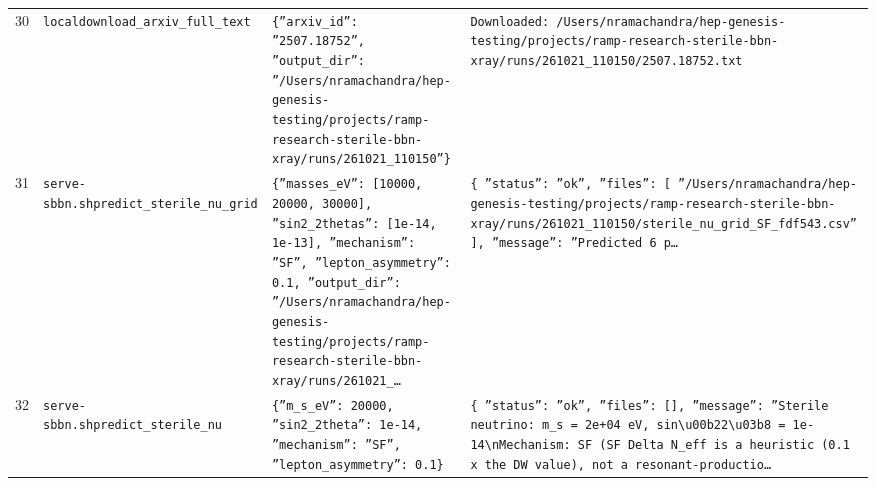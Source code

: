 \documentclass[11pt,a4paper]{article}
\begin{document}
\begin{longtable}{@{}p{}p{}p{}p{}@{}}
30 & \texttt{local}\newline\texttt{download\_\allowbreak{}arxiv\_\allowbreak{}full\_\allowbreak{}text} & \texttt{\{''arxiv\_\allowbreak{}id'':\allowbreak{} ''2507.18752'',\allowbreak{} ''output\_\allowbreak{}dir'':\allowbreak{} ''/\allowbreak{}Users/\allowbreak{}nramachandra/\allowbreak{}hep-genesis-testing/\allowbreak{}projects/\allowbreak{}ramp-research-sterile-bbn-xray/\allowbreak{}runs/\allowbreak{}261021\_\allowbreak{}110150''\}\allowbreak{}} & \texttt{Downloaded:\allowbreak{} /\allowbreak{}Users/\allowbreak{}nramachandra/\allowbreak{}hep-genesis-testing/\allowbreak{}projects/\allowbreak{}ramp-research-sterile-bbn-xray/\allowbreak{}runs/\allowbreak{}261021\_\allowbreak{}110150/\allowbreak{}2507.18752.txt} \\
31 & \texttt{serve-sbbn.sh}\newline\texttt{predict\_\allowbreak{}sterile\_\allowbreak{}nu\_\allowbreak{}grid} & \texttt{\{''masses\_\allowbreak{}eV'':\allowbreak{} [10000,\allowbreak{} 20000,\allowbreak{} 30000]\allowbreak{},\allowbreak{} ''sin2\_\allowbreak{}2thetas'':\allowbreak{} [1e-14,\allowbreak{} 1e-13]\allowbreak{},\allowbreak{} ''mechanism'':\allowbreak{} ''SF'',\allowbreak{} ''lepton\_\allowbreak{}asymmetry'':\allowbreak{} 0.1,\allowbreak{} ''output\_\allowbreak{}dir'':\allowbreak{} ''/\allowbreak{}Users/\allowbreak{}nramachandra/\allowbreak{}hep-genesis-testing/\allowbreak{}projects/\allowbreak{}ramp-research-sterile-bbn-xray/\allowbreak{}runs/\allowbreak{}261021\_\allowbreak{}\ldots{}\allowbreak{}} & \texttt{\{   ''status'':\allowbreak{} ''ok'',\allowbreak{}   ''files'':\allowbreak{} [     ''/\allowbreak{}Users/\allowbreak{}nramachandra/\allowbreak{}hep-genesis-testing/\allowbreak{}projects/\allowbreak{}ramp-research-sterile-bbn-xray/\allowbreak{}runs/\allowbreak{}261021\_\allowbreak{}110150/\allowbreak{}sterile\_\allowbreak{}nu\_\allowbreak{}grid\_\allowbreak{}SF\_\allowbreak{}fdf543.csv''   ]\allowbreak{},\allowbreak{}   ''message'':\allowbreak{} ''Predicted 6 p\ldots{}\allowbreak{}} \\
32 & \texttt{serve-sbbn.sh}\newline\texttt{predict\_\allowbreak{}sterile\_\allowbreak{}nu} & \texttt{\{''m\_\allowbreak{}s\_\allowbreak{}eV'':\allowbreak{} 20000,\allowbreak{} ''sin2\_\allowbreak{}2theta'':\allowbreak{} 1e-14,\allowbreak{} ''mechanism'':\allowbreak{} ''SF'',\allowbreak{} ''lepton\_\allowbreak{}asymmetry'':\allowbreak{} 0.1\}\allowbreak{}} & \texttt{\{   ''status'':\allowbreak{} ''ok'',\allowbreak{}   ''files'':\allowbreak{} []\allowbreak{},\allowbreak{}   ''message'':\allowbreak{} ''Sterile neutrino:\allowbreak{} m\_\allowbreak{}s =\allowbreak{} 2e+04 eV,\allowbreak{} sin\textbackslash{}\allowbreak{}u00b22\textbackslash{}\allowbreak{}u03b8 =\allowbreak{} 1e-14\textbackslash{}\allowbreak{}nMechanism:\allowbreak{} SF (SF Delta N\_\allowbreak{}eff is a heuristic (0.1 x the DW value)\allowbreak{},\allowbreak{} not a resonant-productio\ldots{}\allowbreak{}} \\

\end{longtable}
\end{document}
